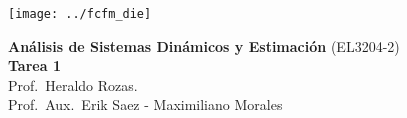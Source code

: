 \documentclass[
  11pt,
  letterpaper,
   addpoints,
   answers
  ]{exam}
\begin{document}
\noindent
\begin{minipage}{0.47\textwidth}
\texttt{[image: ../fcfm\_die]}
\end{minipage}
\begin{minipage}{0.53\textwidth}
\begin{center} 
\large\textbf{Análisis de Sistemas Dinámicos y Estimación} (EL3204-2) \\
\large\textbf{Tarea 1} \\
\normalsize Prof.~Heraldo Rozas.\\
\normalsize Prof.~Aux.~Erik Saez - Maximiliano Morales
\end{center}
\end{minipage}

\vspace{0.5cm}
\noindent
\vspace{.85cm}
\end{document}
